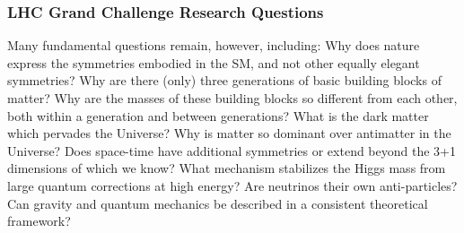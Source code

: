 \begin{frame}
\frametitle{LHC Grand Challenge Research Questions}

Many fundamental questions remain, however, including: Why does nature express the symmetries embodied in the SM, and not other equally elegant symmetries? Why are there (only) three generations of basic building blocks of matter? Why are the masses of these building blocks so different from each other, both within a generation and between generations? What is the dark matter which pervades the Universe? Why is matter so dominant over antimatter in the Universe? Does space-time have additional symmetries or extend beyond the 3+1 dimensions of which we know? What mechanism stabilizes the Higgs mass from large quantum corrections at high energy? Are neutrinos their own anti-particles? Can gravity and quantum mechanics be described in a consistent theoretical framework?

\end{frame}


